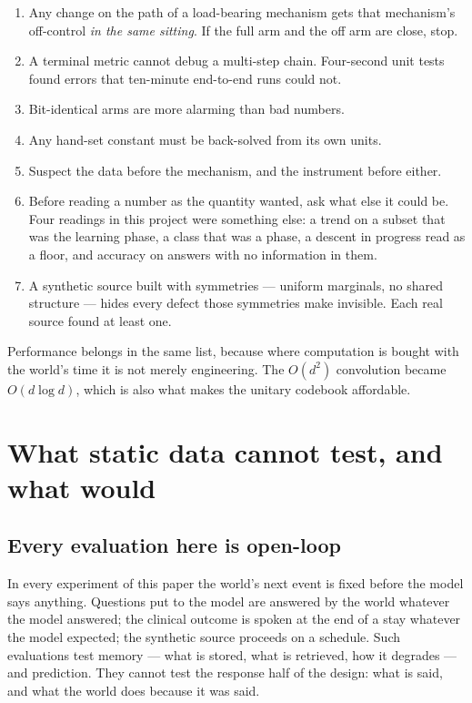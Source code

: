 \documentclass[11pt,a4paper]{article}
\theoremstyle{plain}
\theoremstyle{definition}
\theoremstyle{remark}
\begin{document}
\begin{enumerate}
\item Any change on the path of a load-bearing mechanism gets that mechanism's
off-control \emph{in the same sitting}. If the full arm and the off arm are
close, stop.
\item A terminal metric cannot debug a multi-step chain. Four-second unit tests
found errors that ten-minute end-to-end runs could not.
\item Bit-identical arms are more alarming than bad numbers.
\item Any hand-set constant must be back-solved from its own units.
\item Suspect the data before the mechanism, and the instrument before either.
\item Before reading a number as the quantity wanted, ask what else it could
be. Four readings in this project were something else: a trend on a subset
that was the learning phase, a class that was a phase, a descent in progress
read as a floor, and accuracy on answers with no information in them.
\item A synthetic source built with symmetries --- uniform marginals, no shared
structure --- hides every defect those symmetries make invisible. Each real
source found at least one.
\end{enumerate}

Performance belongs in the same list, because where computation is bought with
the world's time it is not merely engineering. The $O(d^2)$ convolution became
$O(d\log d)$, which is also what makes the unitary codebook affordable.

\section{What static data cannot test, and what would}
\label{sec:closing}

\subsection{Every evaluation here is open-loop}

In every experiment of this paper the world's next event is fixed before the
model says anything. Questions put to the model are answered by the world
whatever the model answered; the clinical outcome is spoken at the end of a
stay whatever the model expected; the synthetic source proceeds on a schedule.
Such evaluations test memory --- what is stored, what is retrieved, how it
degrades --- and prediction. They cannot test the response half of the design:
what is said, and what the world does because it was said.
\end{document}
